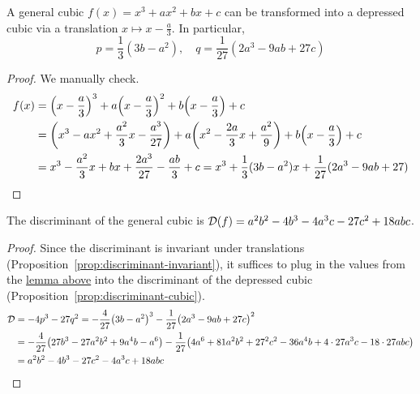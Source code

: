 \begin{lemma}\label{lem:depressed-cubic-translation}
    A general cubic \(f(x) = x^3 + ax^2 + bx + c\)
    can be transformed into a depressed cubic
    via a translation \(x \mapsto x-\frac{a}{3}\).
    In particular,
    \begin{equation*}
        p = \frac{1}{3}(3b-a^2), \quad
        q = \frac{1}{27}(2a^3-9ab+27c)
    \end{equation*}
\end{lemma}
\begin{proof}
    We manually check.
    \begin{align*}
        f(x) &= \pqty{x-\frac{a}{3}}^3 + a\pqty{x-\frac{a}{3}}^2 + b\pqty{x-\frac{a}{3}} + c \\
        &= \pqty{x^3 - ax^2 + \frac{a^2}{3}x - \frac{a^3}{27}}
        + a\pqty{x^2 - \frac{2a}{3}x + \frac{a^2}{9}} + b\pqty{x-\frac{a}{3}} + c \\
        &= x^3 - \frac{a^2}{3}x + bx + \frac{2a^3}{27} - \frac{ab}{3} + c
        = x^3 + \frac{1}{3}(3b-a^2)x + \frac{1}{27}(2a^3 - 9ab + 27)
    \end{align*}
\end{proof}
\begin{proposition}
    The discriminant of the general cubic is
    \(\mathcal{D}(f) = a^2b^2 - 4b^3 - 4a^3c - 27c^2 + 18abc\).
\end{proposition}
\begin{proof}
    Since the discriminant is invariant under translations (Proposition~\ref{prop:discriminant-invariant}),
    it suffices to plug in the values from the \hyperref[lem:depressed-cubic-translation]{lemma above}
    into the discriminant of the depressed cubic (Proposition~\ref{prop:discriminant-cubic}).
    \begin{align*}
        \mca{D} &= -4p^3 - 27q^2 = -\frac{4}{27}\pqty{3b-a^2}^3 - \frac{1}{27}\pqty{2a^3-9ab+27c}^2 \\
        &= -\frac{4}{27}\pqty{27b^3 - 27a^2b^2 + 9a^4b - a^6}
        - \frac{1}{27}\pqty{4a^6 + 81a^2b^2 + 27^2c^2 - 36a^4b + 4 \cdot 27a^3c - 18 \cdot 27abc} \\
        &= a^2b^2 - 4b^3 - 27c^2 - 4a^3c + 18abc
    \end{align*}
\end{proof}

